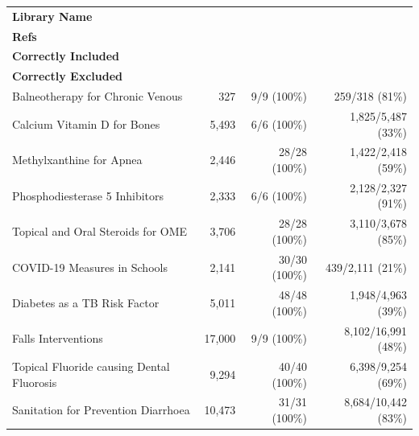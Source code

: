 \begin{tabularx}{\textwidth}{@{} X r r r @{}}
\toprule
\textbf{Library Name} &
\makecell[b]{\textbf{No. of}\\ \textbf{Refs}} &
\makecell[b]{\textbf{Include Studies}\\ \textbf{Correctly Included}} &
\makecell[b]{\textbf{Exclude Studies}\\ \textbf{Correctly Excluded}} \\
\midrule
Balneotherapy for Chronic Venous & 327 & 9/9 (100\%) & 259/318 (81\%) \\
Calcium Vitamin D for Bones & 5,493 & 6/6 (100\%) & 1,825/5,487 (33\%) \\
Methylxanthine for Apnea & 2,446 & 28/28 (100\%) & 1,422/2,418 (59\%) \\
Phosphodiesterase 5 Inhibitors & 2,333 & 6/6 (100\%) & 2,128/2,327 (91\%) \\
Topical and Oral Steroids for OME & 3,706 & 28/28 (100\%) & 3,110/3,678 (85\%) \\
COVID-19 Measures in Schools & 2,141 & 30/30 (100\%) & 439/2,111 (21\%) \\
Diabetes as a TB Risk Factor & 5,011 & 48/48 (100\%) & 1,948/4,963 (39\%) \\
Falls Interventions & 17,000 & 9/9 (100\%) & 8,102/16,991 (48\%) \\
Topical Fluoride causing Dental Fluorosis & 9,294 & 40/40 (100\%) & 6,398/9,254 (69\%) \\
Sanitation for Prevention Diarrhoea & 10,473 & 31/31 (100\%) & 8,684/10,442 (83\%) \\
\bottomrule
\end{tabularx}